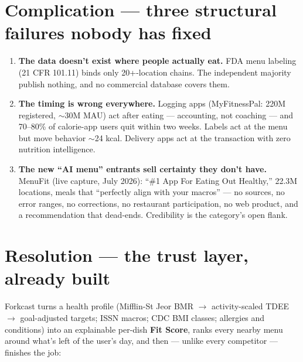 \documentclass[10pt]{article}
\begin{document}
\section{Complication --- three structural failures nobody has fixed}

\begin{enumerate}[leftmargin=1.4em,itemsep=3pt]
\item \textbf{The data doesn't exist where people actually eat.} FDA menu labeling (21 CFR 101.11) binds only 20+-location chains. The independent majority publish nothing, and no commercial database covers them.
\item \textbf{The timing is wrong everywhere.} Logging apps (MyFitnessPal: 220M registered, $\sim$30M MAU) act after eating --- accounting, not coaching --- and 70--80\% of calorie-app users quit within two weeks. Labels act at the menu but move behavior $\sim$24 kcal. Delivery apps act at the transaction with zero nutrition intelligence.
\item \textbf{The new ``AI menu'' entrants sell certainty they don't have.} MenuFit (live capture, July 2026): ``\#1 App For Eating Out Healthy,'' 22.3M locations, meals that ``perfectly align with your macros'' --- no sources, no error ranges, no corrections, no restaurant participation, no web product, and a recommendation that dead-ends. Credibility is the category's open flank.
\end{enumerate}

\section{Resolution --- the trust layer, already built}

Forkcast turns a health profile (Mifflin-St Jeor BMR $\to$ activity-scaled TDEE $\to$ goal-adjusted targets; ISSN macros; CDC BMI classes; allergies and conditions) into an explainable per-dish \textbf{Fit Score}, ranks every nearby menu around what's left of the user's day, and then --- unlike every competitor --- finishes the job:
\end{document}
